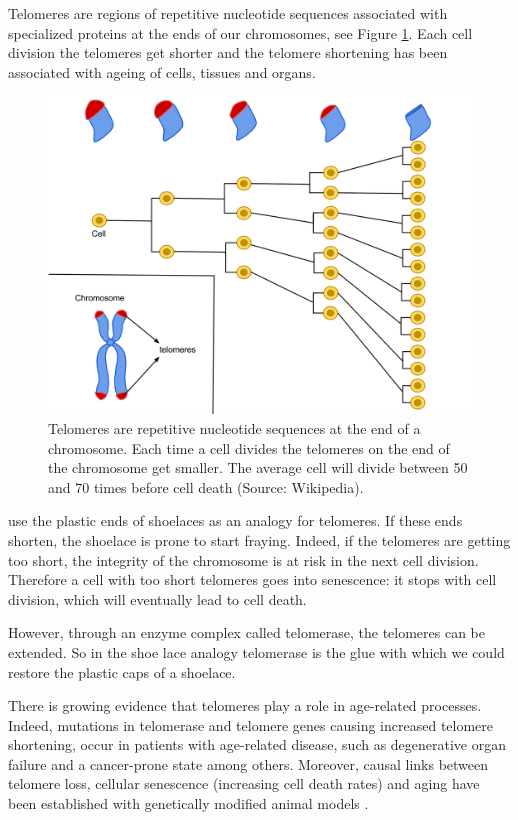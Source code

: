 \documentclass[
  11pt,
]{book}
\begin{document}
Telomeres are regions of repetitive nucleotide sequences associated with specialized proteins at the ends of our chromosomes, see Figure \ref{fig:telomeres}. Each cell division the telomeres get shorter and the telomere shortening has been associated with ageing of cells, tissues and organs.

\begin{figure}

{\centering \includegraphics[width=0.8\linewidth]{./figs/telomeres} 

}

\caption{Telomeres are repetitive nucleotide sequences at the end of a chromosome. Each time a cell divides the telomeres on the end of the chromosome get smaller. The average cell will divide between 50 and 70 times before cell death (Source: Wikipedia).}\label{fig:telomeres}
\end{figure}

\citet{BlackburnEpel2017} use the plastic ends of shoelaces as an analogy for telomeres. If these ends shorten, the shoelace is prone to start fraying. Indeed, if the telomeres are getting too short, the integrity of the chromosome is at risk in the next cell division. Therefore a cell with too short telomeres goes into senescence: it stops with cell division, which will eventually lead to cell death.

However, through an enzyme complex called telomerase, the telomeres can be extended. So in the shoe lace analogy telomerase is the glue with which we could restore the plastic caps of a shoelace.

There is growing evidence that telomeres play a role in age-related processes. Indeed, mutations in telomerase and telomere genes causing increased telomere shortening, occur in patients with age-related disease, such as degenerative organ failure and a cancer-prone state among others. Moreover, causal links between telomere loss, cellular senescence (increasing cell death rates) and aging have been established with genetically modified animal models \citep{Adwan2018}.
\end{document}
